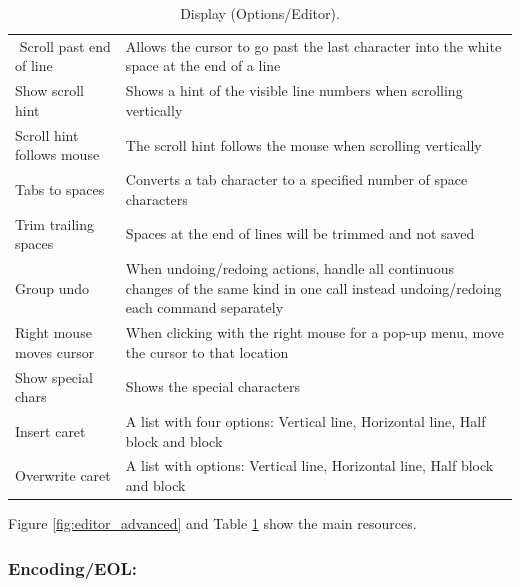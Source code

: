 \begin{table}
\begin{footnotesize}
\begin{tabularx}{\headwidth}{lX}
$$      Scroll past end of line & Allows the cursor to go past the last character into the white space at the end of a line \\
      Show scroll hint & Shows a hint of the visible line numbers when scrolling vertically \\
      Scroll hint follows mouse & The scroll hint follows the mouse when scrolling vertically \\
      Tabs to spaces & Converts a tab character to a specified number of space characters \\
      Trim trailing spaces & Spaces at the end of lines will be trimmed and not saved \\
      Group undo & When undoing/redoing actions, handle all continuous changes of the same kind in one call instead undoing/redoing
      each command separately \\
      Right mouse moves cursor & When clicking with the right mouse for a pop-up menu, move the cursor to that location \\
      Show special chars & Shows the special characters \\
      \hline %
      Insert caret & A list with four options: Vertical line, Horizontal line, Half block and block \\
      Overwrite caret & A list with options: Vertical line, Horizontal line, Half block and block \\
      \hline
    \end{tabularx}
  \end{footnotesize}
  \caption{Display (Options/Editor).}
  \label{tab:editor_advanced}
\end{table}

Figure \ref{fig:editor_advanced} and
Table \ref{tab:editor_advanced}
show the main resources.


\hypertarget{working_editor_encoding_eol}{}
\subsubsection{Encoding/EOL:}

